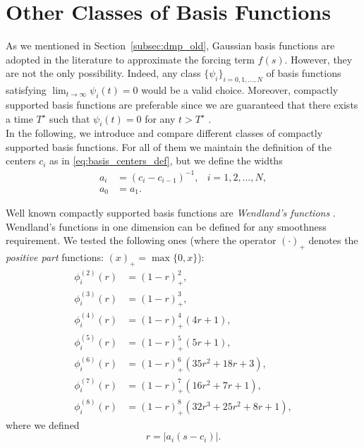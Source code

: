 \documentclass[fleqn, 11pt]{article}
\theoremstyle{definition}
\theoremstyle{plain}
\theoremstyle{remark}
\begin{document}
\section{Other Classes of Basis Functions}

As we mentioned in Section~\ref{subsec:dmp_old}, Gaussian basis functions are adopted in the literature to approximate the forcing term $ f (s) $.
However, they are not the only possibility.
Indeed, any class $ \{ \psi_i \}_{i = 0, 1 ,\ldots, N} $ of basis functions satisfying \( \lim_{t \to \infty} \psi_i(t) = 0 \) would be a valid choice.
Moreover, compactly supported basis functions are preferable since we are guaranteed that there exists a time $ T^\star $ such that $ \psi_i (t) = 0 $ for any $ t > T^\star $ \cite{GSF21}.\\
In the following, we introduce and compare different classes of compactly supported basis functions. For all of them we maintain the definition of the centers $ c_i $ as in \eqref{eq:basis_centers_def}, but we define the widths
\begin{equation}
    \label{eq:basis_width_new_def}
    \begin{aligned}
        a_i & = (c_{i} - c_{i - 1}) ^ {-1}, & i = 1, 2, \ldots, N, \\
        a_0 & = a_1.
    \end{aligned}
\end{equation}

Well known compactly supported basis functions are \emph{Wendland's functions} \cite{Wen95, Sch07}.
Wendland's functions in one dimension can be defined for any smoothness requirement.
We tested the following ones (where the operator $ (\cdot)_+ $ denotes the \emph{positive part} functions: \( (x)_+ = \max \{ 0, x \} \)):
\begin{subequations}
    \label{eqs:wendland_set}
    \begin{align}
        \phi_i^{(2)}(r) & = (1-r)_+^2,                          \label{eq:wen_2} \\
        \phi_i^{(3)}(r) & = (1-r)_+^3,                          \label{eq:wen_3} \\
        \phi_i^{(4)}(r) & = (1-r)_+^4 (4r + 1),                 \label{eq:wen_4} \\
        \phi_i^{(5)}(r) & = (1-r)_+^5 (5r + 1),                 \label{eq:wen_5} \\
        \phi_i^{(6)}(r) & = (1-r)_+^6 (35r^2 + 18r + 3),        \label{eq:wen_6} \\
        \phi_i^{(7)}(r) & = (1-r)_+^7(16 r^2 + 7 r + 1),        \label{eq:wen_7} \\
        \phi_i^{(8)}(r) & = (1-r)_+^8 (32r^3 + 25r^2 + 8r + 1), \label{eq:wen_8}
    \end{align}
\end{subequations}
where we defined
\[ r = | a_i (s - c_i) | . \]
\end{document}
